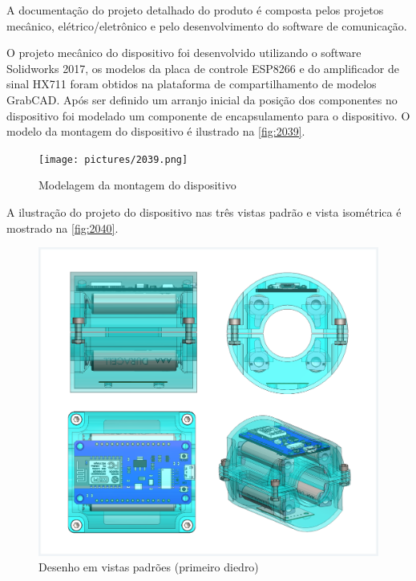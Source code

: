 A documentação do projeto detalhado do produto é composta pelos projetos mecânico, elétrico/eletrônico e pelo desenvolvimento do software de comunicação.

O projeto mecânico do dispositivo foi desenvolvido utilizando o software Solidworks 2017, os modelos da placa de controle ESP8266 e do amplificador de sinal HX711
foram obtidos na plataforma de compartilhamento de modelos GrabCAD. Após ser definido um arranjo inicial da posição dos componentes no dispositivo foi modelado um
componente de encapsulamento para o dispositivo.
O modelo da montagem do dispositivo é ilustrado na \autoref{fig:2039}.

\begin{figure}[H]
	\caption{\label{fig:2039} Modelagem da montagem do dispositivo}
	\begin{center}
		\texttt{[image: pictures/2039.png]}
	\end{center}
\end{figure}

A ilustração do projeto do dispositivo nas três vistas padrão e vista isométrica é mostrado na \autoref{fig:2040}.

\begin{figure}[H]
	\caption{\label{fig:2040} Desenho em vistas padrões (primeiro diedro)}
	\begin{center}
		\includegraphics[width=\textwidth]{pictures/2040.png}
	\end{center}
\end{figure}

